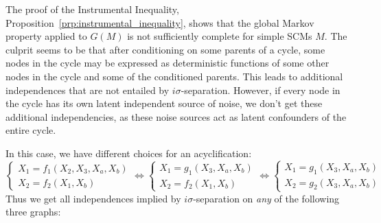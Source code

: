   \begin{Rem}
  The proof of the Instrumental Inequality, Proposition~\ref{prp:instrumental_inequality}, shows that the global Markov property applied to $G(M)$ is not sufficiently complete for simple SCMs $M$.
  The culprit seems to be that after conditioning on some parents of a cycle, some nodes in the cycle may be expressed as deterministic functions of some other nodes in the cycle and some of the conditioned parents.
  This leads to additional independences that are not entailed by $i\sigma$-separation.
  However, if every node in the cycle has its own latent independent source of noise, we don't get these additional independencies, as these noise sources act as latent confounders of the entire cycle.

  In this case, we have different choices for an acyclification:
  $$\begin{cases}
    X_1 = f_1(X_2,X_3,X_a,X_b) \\
    X_2 = f_2(X_1,X_b)
  \end{cases} \iff
  \begin{cases}
    X_1 = g_1(X_3,X_a,X_b) \\
    X_2 = f_2(X_1,X_b)
  \end{cases} \iff
  \begin{cases}
    X_1 = g_1(X_3,X_a,X_b) \\
    X_2 = g_2(X_3,X_a,X_b)
  \end{cases}$$
  Thus we get all independences implied by $i\sigma$-separation on \emph{any} of the following three graphs:
  \begin{center}
\end{center}
\end{Rem}
